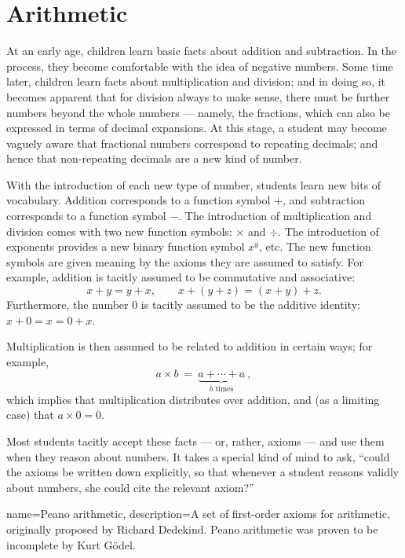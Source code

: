 
   


\section{Arithmetic}

At an early age, children learn basic facts about addition and
subtraction.  In the process, they become comfortable with the idea of
negative numbers.  Some time later, children learn facts about
multiplication and division; and in doing so, it becomes apparent that
for division always to make sense, there must be further numbers
beyond the whole numbers --- namely, the fractions, which can also be
expressed in terms of decimal expansions.  At this stage, a student
may become vaguely aware that fractional numbers correspond to
repeating decimals; and hence that non-repeating decimals are a new
kind of number.

With the introduction of each new type of number, students learn new
bits of vocabulary.  Addition corresponds to a function symbol $+$,
and subtraction corresponds to a function symbol $-$.  The
introduction of multiplication and division comes with two new
function symbols: $\times$ and $\div$.  The introduction of exponents
provides a new binary function symbol $x^y$, etc.  The new function
symbols are given meaning by the axioms they are assumed to satisfy.
For example, addition is tacitly assumed to be commutative and
associative:
\[ x+y=y+x , \qquad x+(y+z)=(x+y)+z .\] Furthermore, the number $0$
is tacitly assumed to be the additive identity: $x+0=x=0+x$.

Multiplication is then assumed to be related to addition in certain
ways; for example, 
\[ a\times b \: = \: \underbrace{a+\cdots + a}_{\text{$b$ times}} \: ,\]
which implies that multiplication distributes over addition, and (as a
limiting case) that $a\times 0=0$.

Most students tacitly accept these facts --- or, rather, axioms ---
and use them when they reason about numbers.  It takes a special kind
of mind to ask, ``could the axioms be written down explicitly, so that
whenever a student reasons validly about numbers, she could cite the
relevant axiom?''

{
  name={Peano arithmetic},
  description={A set of first-order axioms for arithmetic, originally proposed by
 Richard Dedekind.  Peano arithmetic was proven to be incomplete by
 Kurt G{\"o}del.} }

